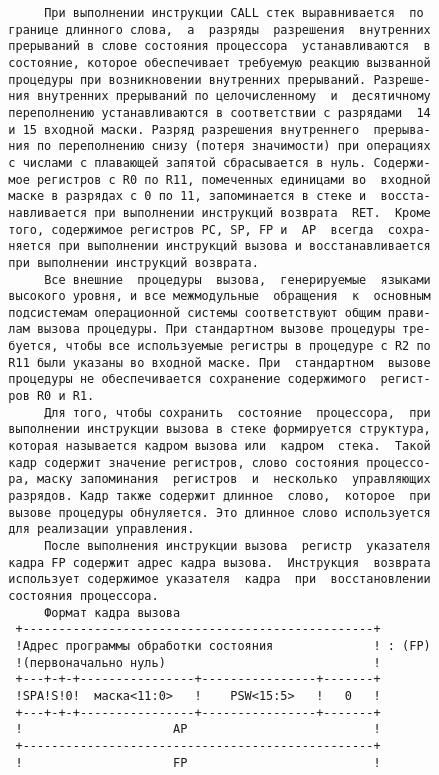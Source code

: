 \begin{verbatim}
       При выполнении инструкции CALL стек выравнивается  по
  границе длинного слова,  а  разряды  разрешения  внутренних
  прерываний в слове состояния процессора  устанавливаются  в
  состояние, которое обеспечивает требуемую реакцию вызванной
  процедуры при возникновении внутренних прерываний. Разреше-
  ния внутренних прерываний по целочисленному  и  десятичному
  переполнению устанавливаются в соответствии с разрядами  14
  и 15 входной маски. Разряд разрешения внутреннего  прерыва-
  ния по переполнению снизу (потеря значимости) при операциях
  с числами с плавающей запятой сбрасывается в нуль. Содержи-
  мое регистров с R0 по R11, помеченных единицами во  входной
  маске в разрядах с 0 по 11, запоминается в стеке и  восста-
  навливается при выполнении инструкций возврата  RET.  Кроме
  того, содержимое регистров PC, SP, FP и  AP  всегда  сохра-
  няется при выполнении инструкций вызова и восстанавливается
  при выполнении инструкций возврата.
       Все внешние  процедуры  вызова,  генерируемые  языками
  высокого уровня, и все межмодульные  обращения  к  основным
  подсистемам операционной системы соответствуют общим прави-
  лам вызова процедуры. При стандартном вызове процедуры тре-
  буется, чтобы все используемые регистры в процедуре с R2 по
  R11 были указаны во входной маске. При  стандартном  вызове
  процедуры не обеспечивается сохранение содержимого  регист-
  ров R0 и R1.
       Для того, чтобы сохранить  состояние  процессора,  при
  выполнении инструкции вызова в стеке формируется структура,
  которая называется кадром вызова или  кадром  стека.  Такой
  кадр содержит значение регистров, слово состояния процессо-
  ра, маску запоминания  регистров  и  несколько  управляющих
  разрядов. Кадр также содержит длинное  слово,  которое  при
  вызове процедуры обнуляется. Это длинное слово используется
  для реализации управления.
       После выполнения инструкции вызова  регистр  указателя
  кадра FP содержит адрес кадра вызова.  Инструкция  возврата
  использует содержимое указателя  кадра  при  восстановлении
  состояния процессора.
       Формат кадра вызова
   +-------------------------------------------------+
   !Адрес программы обработки состояния              ! : (FP)
   !(первоначально нуль)                             !
   +---+-+-+----------------+----------------+-------+
   !SPA!S!0!  маска<11:0>   !    PSW<15:5>   !   0   !
   +---+-+-+----------------+----------------+-------+
   !                     AP                          !
   +-------------------------------------------------+
   !                     FP                          !

\end{verbatim}
